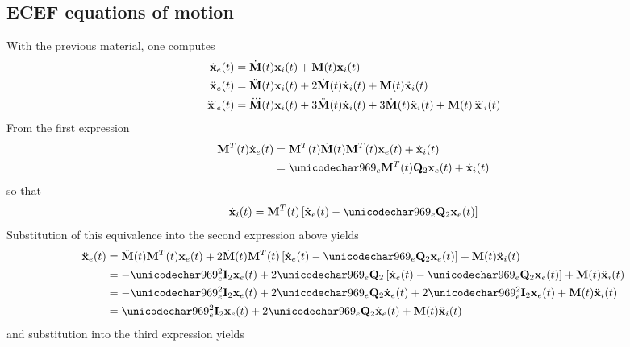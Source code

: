 \subsection{ECEF equations of motion}
With the previous material, one computes
\begin{align}
 \dot{\vct{x}}_e(t) &= \dot{\mtx{M}}(t)\vct{x}_i(t) + \mtx{M}(t)\dot{\vct{x}}_i(t)\\
 \ddot{\vct{x}}_e(t) &= \ddot{\mtx{M}}(t)\vct{x}_i(t) + 2\dot{\mtx{M}}(t)\dot{\vct{x}}_i(t) + \mtx{M}(t)\ddot{\vct{x}}_i(t)\\
 \dddot{\vct{x}}_e(t) &= \dddot{\mtx{M}}(t)\vct{x}_i(t) + 3\ddot{\mtx{M}}(t)\dot{\vct{x}}_i(t) + 3\dot{\mtx{M}}(t)\ddot{\vct{x}}_i(t) + \mtx{M}(t)\dddot{\vct{x}}_i(t)
\end{align}
From the first expression
\begin{equation}
\begin{split}
 \mtx{M}^T(t)\dot{\vct{x}}_e(t) &= \mtx{M}^T(t)\dot{\mtx{M}}(t)\mtx{M}^T(t)\vct{x}_e(t) + \dot{\vct{x}}_i(t)\\
 &= \omega_e\mtx{M}^T(t)\Qtwo\vct{x}_e(t) + \dot{\vct{x}}_i(t)
 \end{split}
\end{equation}
so that
\begin{equation}
 \dot{\vct{x}}_i(t) = \mtx{M}^T(t)\left[\dot{\vct{x}}_e(t) - \omega_e\Qtwo\vct{x}_e(t)\right]
\end{equation}
Substitution of this equivalence into the second expression above yields
\begin{equation}
\begin{split}
\ddot{\vct{x}}_e(t) &= \ddot{\mtx{M}}(t)\mtx{M}^T(t)\vct{x}_e(t) + 2\dot{\mtx{M}}(t)\mtx{M}^T(t)\left[\dot{\vct{x}}_e(t) - \omega_e\Qtwo\vct{x}_e(t)\right] + \mtx{M}(t)\ddot{\vct{x}}_i(t)\\
&= -\omega_e^2\Itwo\vct{x}_e(t) + 2\omega_e\Qtwo\left[\dot{\vct{x}}_e(t) - \omega_e\Qtwo\vct{x}_e(t)\right] + \mtx{M}(t)\ddot{\vct{x}}_i(t)\\
&= -\omega_e^2\Itwo\vct{x}_e(t) + 2\omega_e\Qtwo\dot{\vct{x}}_e(t) + 2\omega^2_e\Itwo\vct{x}_e(t) + \mtx{M}(t)\ddot{\vct{x}}_i(t)\\
&= \omega_e^2\Itwo\vct{x}_e(t) + 2\omega_e\Qtwo\dot{\vct{x}}_e(t) + \mtx{M}(t)\ddot{\vct{x}}_i(t)
\end{split}
\label{eq:inertialddot}
\end{equation}
and substitution into the third expression yields
